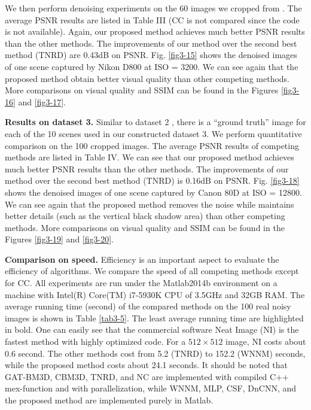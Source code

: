 We then perform denoising experiments on the 60 images we cropped from \cite{crosschannel2016}. The average PSNR results are listed in Table III (CC is not compared since the code is not available). Again, our proposed method achieves much better PSNR results than the other methods. The improvements of our method over the second best method (TNRD) are 0.43dB on PSNR. Fig. \ref{fig3-15} shows the denoised images of one scene captured by Nikon D800 at ISO = 3200. We can see again that the proposed method obtain better visual quality than other competing methods. More comparisons on visual quality and SSIM can be found in the Figures \ref{fig3-16} and \ref{fig3-17}.

\textbf{Results on dataset 3.}
Similar to dataset 2 \cite{crosschannel2016}, there is a ``ground truth'' image for each of the 10 scenes used in our constructed dataset 3. We perform quantitative comparison on the 100 cropped images. The average PSNR results of competing methods are listed in Table IV. We can see that our proposed method achieves much better PSNR results than the other methods. The improvements of our method over the second best method (TNRD) is 0.16dB on PSNR. Fig. \ref{fig3-18} shows the denoised images of one scene captured by Canon 80D at ISO = 12800. We can see again that the proposed method removes the noise while maintains better details (such as the vertical black shadow area) than other competing methods. More comparisons on visual quality and SSIM can be found in the Figures \ref{fig3-19} and \ref{fig3-20}.

\textbf{Comparison on speed.}
Efficiency is an important aspect to evaluate the efficiency of algorithms. We compare the speed of all competing methods except for CC. All experiments are run under the Matlab2014b environment on a machine with Intel(R) Core(TM) i7-5930K CPU of 3.5GHz and 32GB RAM. The average running time (second) of the compared methods on the 100 real noisy images is shown in Table \ref{tab3-5}. The least average running time are highlighted in bold. One can easily see that the commercial software Neat Image (NI) is the fastest method with highly optimized code. For a $512\times512$ image, NI costs about 0.6 second. The other methods cost from 5.2 (TNRD) to 152.2 (WNNM) seconds, while the proposed method costs about 24.1 seconds. It should be noted that GAT-BM3D, CBM3D, TNRD, and NC are implemented with compiled C++ mex-function and with parallelization, while WNNM, MLP, CSF, DnCNN, and the proposed method are implemented purely in Matlab. 


